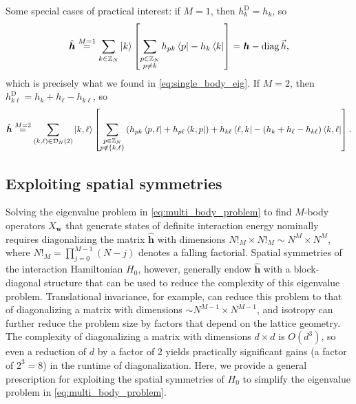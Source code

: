 \documentclass[nofootinbib,notitlepage,11pt]{revtex4-2}
\renewcommand{\t}{\text} %
\newcommand{\p}[1]{\left(#1\right)} %
\renewcommand{\sp}[1]{\left[#1\right]} %
\renewcommand{\set}[1]{\left\{#1\right\}} %
\newcommand{\m}{\bm} %
\renewcommand{\v}{\vec} %
\newcommand{\1}{\mathds{1}}
\newcommand{\D}{\mathcal{D}}
\newcommand{\ZZ}{\mathbb{Z}}
\DeclareMathOperator{\diag}{diag}
\begin{document}
Some special cases of practical interest: if $M=1$, then
$h^{\t{D}}_k=h_k$, so
\begin{align}
  \hat{\m h} \stackrel{M=1}{=} \sum_{k\in\ZZ_N} \ket{k}
  \sp{\sum_{\substack{p\in\ZZ_N\\p\ne k}} h_{pk} \bra{p} - h_k \bra{k}}
  = \m h - \diag\v h,
\end{align}
which is precisely what we found in \eqref{eq:single_body_eig}.  If
$M=2$, then $h_{k\ell}^{\t{D}}=h_k+h_\ell-h_{k\ell}$, so
\begin{align}
  \hat{\m h} \stackrel{M=2}{=}
  \sum_{\p{k,\ell}\in\D_N\p{2}} \ket{k,\ell}
  \sp{\sum_{\substack{p\in\ZZ_N\\p\notin\set{k,\ell}}}
    \p{ h_{pk} \bra{p,\ell} + h_{p\ell} \bra{k,p} }
    + h_{k\ell} \bra{\ell,k}
    - \p{h_k + h_\ell - h_{k\ell}} \bra{k,\ell}}.
\end{align}

\subsection{Exploiting spatial symmetries}
\label{sec:symmetries}

Solving the eigenvalue problem in \eqref{eq:multi_body_problem} to
find $M$-body operators $X_{\m w}$ that generate states of definite
interaction energy nominally requires diagonalizing the matrix
$\hat{\m h}$ with dimensions $N!_M\times N!_M\sim N^M\times N^M$,
where $N!_M=\prod_{j=0}^{M-1}\p{N-j}$ denotes a falling factorial.
Spatial symmetries of the interaction Hamiltonian $H_0$, however,
generally endow $\hat{\m h}$ with a block-diagonal structure that can
be used to reduce the complexity of this eigenvalue problem.
Translational invariance, for example, can reduce this problem to that
of diagonalizing a matrix with dimensions
$\sim N^{M-1}\times N^{M-1}$, and isotropy can further reduce the
problem size by factors that depend on the lattice geometry.  The
complexity of diagonalizing a matrix with dimensions $d\times d$ is
$O\p{d^3}$, so even a reduction of $d$ by a factor of 2 yields
practically significant gains (a factor of $2^3=8$) in the runtime of
diagonalization.  Here, we provide a general prescription for
exploiting the spatial symmetries of $H_0$ to simplify the eigenvalue
problem in \eqref{eq:multi_body_problem}.
\end{document}
